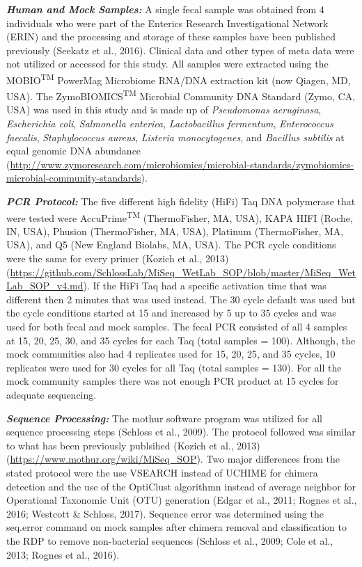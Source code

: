 \documentclass[12pt,]{article}
\begin{document}
\textbf{\emph{Human and Mock Samples:}} A single fecal sample was
obtained from 4 individuals who were part of the Enterics Research
Investigational Network (ERIN) and the processing and storage of these
samples have been published previously (Seekatz et al., 2016). Clinical
data and other types of meta data were not utilized or accessed for this
study. All samples were extracted using the MOBIO\textsuperscript{TM}
PowerMag Microbiome RNA/DNA extraction kit (now Qiagen, MD, USA). The
ZymoBIOMICS\textsuperscript{TM} Microbial Community DNA Standard (Zymo,
CA, USA) was used in this study and is made up of \emph{Pseudomonas
aeruginosa}, \emph{Escherichia coli}, \emph{Salmonella enterica},
\emph{Lactobacillus fermentum}, \emph{Enterococcus faecalis},
\emph{Staphylococcus aureus}, \emph{Listeria monocytogenes}, and
\emph{Bacillus subtilis} at equal genomic DNA abundance
(\url{http://www.zymoresearch.com/microbiomics/microbial-standards/zymobiomics-microbial-community-standards}).

\textbf{\emph{PCR Protocol:}} The five different high fidelity (HiFi)
Taq DNA polymerase that were tested were AccuPrime\textsuperscript{TM}
(ThermoFisher, MA, USA), KAPA HIFI (Roche, IN, USA), Phusion
(ThermoFisher, MA, USA), Platinum (ThermoFisher, MA, USA), and Q5 (New
England Biolabs, MA, USA). The PCR cycle conditions were the same for
every primer (Kozich et al., 2013)
(\url{https://github.com/SchlossLab/MiSeq_WetLab_SOP/blob/master/MiSeq_WetLab_SOP_v4.md}).
If the HiFi Taq had a specific activation time that was different then 2
minutes that was used instead. The 30 cycle default was used but the
cycle conditions started at 15 and increased by 5 up to 35 cycles and
was used for both fecal and mock samples. The fecal PCR consisted of all
4 samples at 15, 20, 25, 30, and 35 cycles for each Taq (total samples =
100). Although, the mock communities also had 4 replicates used for 15,
20, 25, and 35 cycles, 10 replicates were used for 30 cycles for all Taq
(total samples = 130). For all the mock community samples there was not
enough PCR product at 15 cycles for adequate sequencing.

\textbf{\emph{Sequence Processing:}} The mothur software program was
utilized for all sequence processing steps (Schloss et al., 2009). The
protocol followed was similar to what has been previously publsihed
(Kozich et al., 2013) (\url{https://www.mothur.org/wiki/MiSeq_SOP}). Two
major differences from the stated protocol were the use VSEARCH instead
of UCHIME for chimera detection and the use of the OptiClust algorithmn
instead of average neighbor for Operational Taxonomic Unit (OTU)
generation (Edgar et al., 2011; Rognes et al., 2016; Westcott \&
Schloss, 2017). Sequence error was determined using the seq.error
command on mock samples after chimera removal and classification to the
RDP to remove non-bacterial sequences (Schloss et al., 2009; Cole et
al., 2013; Rognes et al., 2016).
\end{document}
